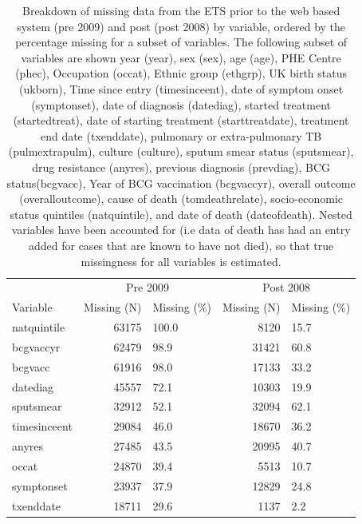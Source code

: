 \documentclass[11pt,twoside]{bristolthesis}
\begin{document}
  \begin{table}[H]
  
  \caption[Breakdown of missing data from the ETS prior to the web based system (pre 2009) and post (post 2008) by variable, ordered by the  percentage missing for a subset of variables.]{\label{tab:missing-var-tabs}Breakdown of missing data from the ETS prior to the web based system (pre 2009) and post (post 2008) by variable, ordered by the  percentage missing for a subset of variables. The following subset of variables are shown year (year), sex (sex), age (age), PHE Centre (phec), Occupation (occat), Ethnic group (ethgrp), UK birth status (ukborn), Time since entry (timesinceent), date of symptom onset (symptonset), date of diagnosis (datediag), started treatment (startedtreat), date of starting treatment (starttreatdate), treatment end date (txenddate), pulmonary or extra-pulmonary TB (pulmextrapulm), culture (culture), sputum smear status (sputsmear), drug resistance (anyres), previous diagnosis (prevdiag), BCG status(bcgvacc), Year of BCG vaccination (bcgvaccyr), overall outcome (overalloutcome), cause of death (tomdeathrelate), socio-economic status quintiles (natquintile), and date of death (dateofdeath). Nested variables have been accounted for (i.e data of death has had an entry added for cases that are known to have not died), so that true missingness for all variables is estimated.}
  \centering
  \begin{tabular}{lrlrl}
  \toprule
  \multicolumn{1}{c}{ } & \multicolumn{2}{c}{Pre 2009} & \multicolumn{2}{c}{Post 2008} \\
  \cmidrule(l{3pt}r{3pt}){2-3} \cmidrule(l{3pt}r{3pt}){4-5}
  Variable & Missing (N) &  Missing (\%) & Missing (N) &  Missing (\%)\\
  \midrule
  natquintile & 63175 & 100.0 & 8120 & 15.7\\
  bcgvaccyr & 62479 & 98.9 & 31421 & 60.8\\
  bcgvacc & 61916 & 98.0 & 17133 & 33.2\\
  datediag & 45557 & 72.1 & 10303 & 19.9\\
  sputsmear & 32912 & 52.1 & 32094 & 62.1\\
  \addlinespace
  timesinceent & 29084 & 46.0 & 18670 & 36.2\\
  anyres & 27485 & 43.5 & 20995 & 40.7\\
  occat & 24870 & 39.4 & 5513 & 10.7\\
  symptonset & 23937 & 37.9 & 12829 & 24.8\\
  txenddate & 18711 & 29.6 & 1137 & 2.2\\

\end{tabular}
\end{table}
\end{document}
